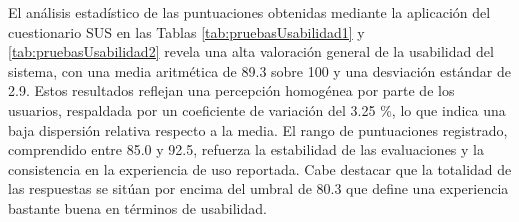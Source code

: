 
El análisis estadístico de las puntuaciones obtenidas mediante la aplicación del cuestionario SUS en las Tablas \ref{tab:pruebasUsabilidad1} y \ref{tab:pruebasUsabilidad2} revela una alta valoración general de la usabilidad del sistema, con una media aritmética de 89.3 sobre 100 y una desviación estándar de 2.9. Estos resultados reflejan una percepción homogénea por parte de los usuarios, respaldada por un coeficiente de variación del 3.25 \%, lo que indica una baja dispersión relativa respecto a la media. El rango de puntuaciones registrado, comprendido entre 85.0 y 92.5, refuerza la estabilidad de las evaluaciones y la consistencia en la experiencia de uso reportada. Cabe destacar que la totalidad de las respuestas se sitúan por encima del umbral de 80.3 que define una experiencia bastante buena en términos de usabilidad.

